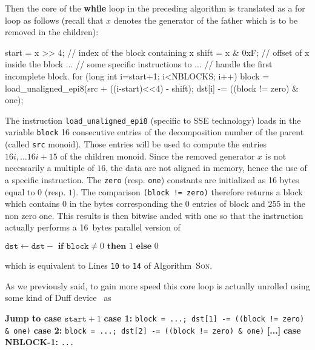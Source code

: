 \documentclass[reqno,11pt]{amsart}
\theoremstyle{plain}
\theoremstyle{definition}
\renewcommand{\tt}[1]{\texttt{#1}}
\begin{document}
Then the core of the \textbf{while} loop in the preceding algorithm is
translated as a for loop as follows (recall that $x$ denotes the generator of
the father which is to be removed in the children):
\begin{listing}{1}
start = x >> 4;      // index of the block containing x
shift = x & 0xF;     // offset of x inside the block
...                  // some specific instructions to
...                  // handle the first incomplete block.
for (long int i=start+1; i<NBLOCKS; i++) {
  block = load_unaligned_epi8(src + ((i-start)<<4) - shift);
  dst[i] -= ((block != zero) & one);
}
\end{listing}
The instruction \tt{load\_unaligned\_epi8} (specific to SSE technology) loads
in the variable \tt{block} 16 consecutive entries of the decomposition number
of the parent (called \tt{src} monoid). Those entries will be used to compute
the entries $16i, \dots 16i+15$ of the children monoid. Since the removed
generator $x$ is not necessarily a multiple of $16$, the data are not aligned
in memory, hence the use of a specific instruction. The \tt{zero}
(resp. \tt{one}) constants are initialized as 16 bytes equal to $0$
(resp. $1$). The comparison \tt{(block != zero)} therefore returns a block
which contains $0$ in the bytes corresponding the $0$ entries of block and
$255$ in the non zero one. This results is then bitwise anded with one so that
the instruction actually performs a 16~bytes parallel version of
\begin{algorithmic}
\State $\tt{dst} \gets \tt{dst} -
\textbf{ if } \tt{block} \neq 0 \textbf{ then } 1 \textbf{ else } 0$
\end{algorithmic}
which is equivalent to Lines \tt{10} to \tt{14} of Algorithm~\textsc{Son}.
\medskip

As we previously said, to gain more speed this core loop is actually unrolled
using some kind of Duff device~\cite{Duff} as
\begin{algorithmic}
\State \textbf{Jump to case } $\tt{start}+1$
\State \textbf{case 1:} \tt{block = ...; dst[1] -= ((block != zero) \& one)}
\State \textbf{case 2:} \tt{block = ...; dst[2] -= ((block != zero) \& one)}
\State \textbf{[...]}
\State \textbf{case NBLOCK-1:} \tt{...}
\end{algorithmic}

\end{document}
